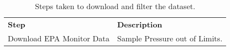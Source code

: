 \begin{table}[h!]
\caption{Steps taken to download and filter the dataset.}
\label{tab:data_cleaning_steps}
\begin{tabular}{ll}
\textbf{Step} & \textbf{Description}          \\
Download EPA Monitor Data & Sample Pressure out of Limits.
\end{tabular}
\end{table}